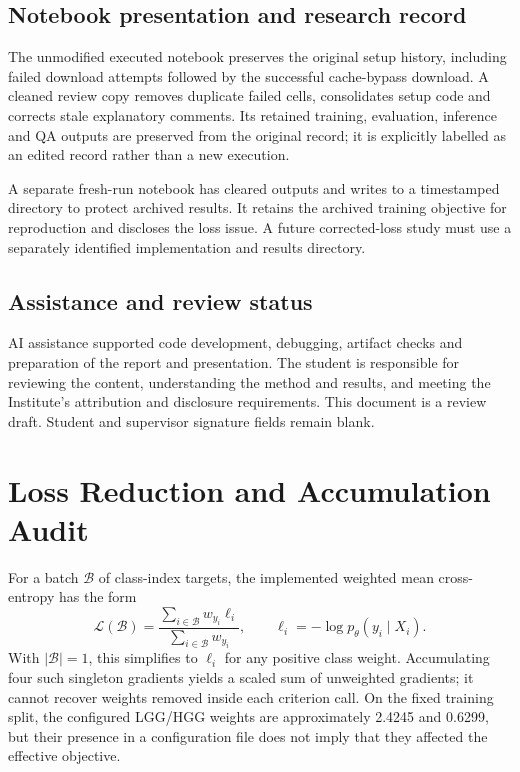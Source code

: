 \documentclass[12pt,a4paper,oneside]{report}
\begin{document}
\section{Notebook presentation and research record}
The unmodified executed notebook preserves the original setup history, including failed download attempts followed by the successful cache-bypass download. A cleaned review copy removes duplicate failed cells, consolidates setup code and corrects stale explanatory comments. Its retained training, evaluation, inference and QA outputs are preserved from the original record; it is explicitly labelled as an edited record rather than a new execution.

A separate fresh-run notebook has cleared outputs and writes to a timestamped directory to protect archived results. It retains the archived training objective for reproduction and discloses the loss issue. A future corrected-loss study must use a separately identified implementation and results directory.

\section{Assistance and review status}
AI assistance supported code development, debugging, artifact checks and preparation of the report and presentation. The student is responsible for reviewing the content, understanding the method and results, and meeting the Institute's attribution and disclosure requirements. This document is a review draft. Student and supervisor signature fields remain blank.

\chapter{Loss Reduction and Accumulation Audit}
\label{app:loss}
For a batch $\mathcal B$ of class-index targets, the implemented weighted mean cross-entropy has the form~\cite{pytorchce}
\begin{equation}
\mathcal L(\mathcal B)=
\frac{\sum_{i\in\mathcal B}w_{y_i}\ell_i}{\sum_{i\in\mathcal B}w_{y_i}},
\qquad \ell_i=-\log p_\theta(y_i\mid X_i).
\end{equation}
With $|\mathcal B|=1$, this simplifies to $\ell_i$ for any positive class weight. Accumulating four such singleton gradients yields a scaled sum of unweighted gradients; it cannot recover weights removed inside each criterion call. On the fixed training split, the configured LGG/HGG weights are approximately 2.4245 and 0.6299, but their presence in a configuration file does not imply that they affected the effective objective.
\end{document}
